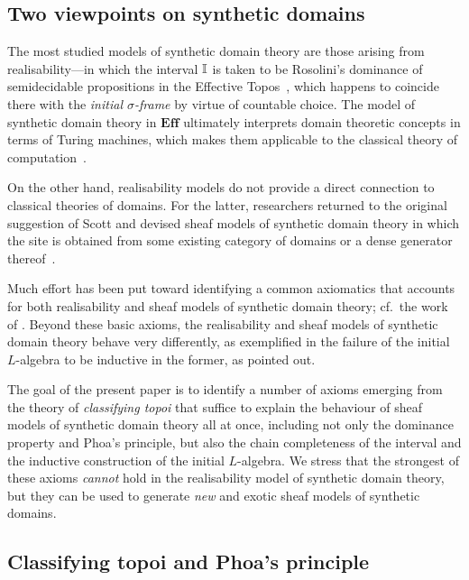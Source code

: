 \subsection{Two viewpoints on synthetic domains}

The most studied models of synthetic domain theory are those arising from realisability---in which the interval $\mathbb{I}$ is taken to be Rosolini's dominance of semidecidable propositions in the Effective Topos~\citep{hyland1990first,PhoaWesleyKym-Son1991DtiR}, which happens to coincide there with the \emph{initial $\sigma$-frame} by virtue of countable choice. The model of synthetic domain theory in $\mathbf{Eff}$ ultimately interprets domain theoretic concepts in terms of Turing machines, which makes them applicable to the classical theory of computation~\citep{RN552}. 

On the other hand, realisability models do not provide a direct connection to classical theories of domains. For the latter, researchers returned to the original suggestion of Scott and devised sheaf models of synthetic domain theory in which the site is obtained from some existing category of domains or a dense generator thereof~\citep{fiore-plotkin:1996,FIORE1997151,fiore2001domains}.

Much effort has been put toward identifying a common axiomatics that accounts for both realisability and sheaf models of synthetic domain theory; cf.\ the work of \citet{reus-streicher:1999,simpson:2004}. Beyond these basic axioms, the realisability and sheaf models of synthetic domain theory behave very differently, as exemplified in the failure of the initial $L$-algebra to be inductive in the former, as \citet{VANOOSTEN2000233} pointed out.

The goal of the present paper is to identify a number of axioms emerging from the theory of \emph{classifying topoi} that suffice to explain the behaviour of sheaf models of synthetic domain theory all at once, including not only the dominance property and Phoa's principle, but also the chain completeness of the interval and the inductive construction of the initial $L$-algebra. We stress that the strongest of these axioms \emph{cannot} hold in the realisability model of synthetic domain theory, but they can be used to generate \emph{new} and exotic sheaf models of synthetic domains.

\subsection{Classifying topoi and Phoa's principle}\label{subsec:classtopphoa}

